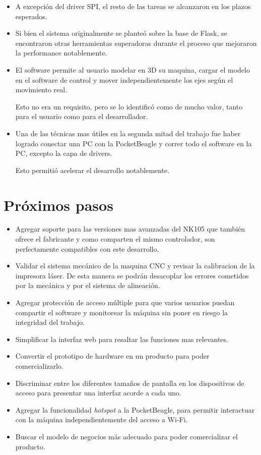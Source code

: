 \begin{itemize}
   \item{A excepción del driver SPI, el resto de las tareas se alcanzaron en los plazos esperados.}

   \item{Si bien el sistema originalmente se planteó sobre la base de Flask, se encontraron otras herramientas superadoras durante el proceso que mejoraron la performance notablemente.}

   \item{El software permite al usuario modelar en 3D su maquina, cargar el modelo en el software de control y mover independientemente los ejes según el movimiento real.\par
      Esto no era un requisito, pero se lo identificó como de mucho valor, tanto para el usuario como para el desarrollador.}

   \item{Una de las técnicas mas útiles en la segunda mitad del trabajo fue haber logrado conectar una PC con la PocketBeagle y correr todo el software en la PC, excepto la capa de drivers.\par Esto permitió acelerar el desarrollo notablemente.}

\end{itemize}


\section{Próximos pasos}

\begin{itemize}
\item{Agregar soporte para las versiones mas avanzadas del NK105 que también ofrece el fabricante y como comparten el mismo controlador, son perfectamente compatibles con este desarrollo.}
\item{Validar el sistema mecánico de la maquina CNC y revisar la calibracion de la impresora láser. De esta manera se podrán desacoplar los errores cometidos por la mecánica y por el sistema de alineación.}
\item{Agregar protección de acceso múltiple para que varios usuarios puedan compartir el software y monitorear la máquina sin poner en riesgo la integridad del trabajo.}
\item{Simplificar la interfaz web para resaltar las funciones mas relevantes.}
\item{Convertir el prototipo de hardware en un producto para poder comercializarlo.}
\item{Discriminar entre los diferentes tamaños de pantalla en los dispositivos de acceso para presentar una interfaz acorde a cada uno.}
\item{Agregar la funcionalidad \textit{hotspot} a la PocketBeagle, para permitir interactuar con la máquina independientemente del acceso a Wi-Fi.}
\item{Buscar el modelo de negocios más adecuado para poder comercializar el producto.}
\end{itemize}
